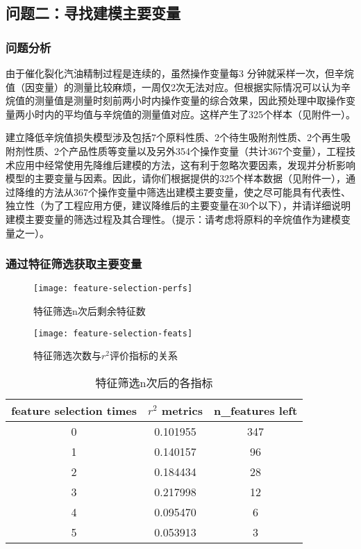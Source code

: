\documentclass[bwprint]{gmcmthesis}
\begin{document}
\FloatBarrier
\subsection{问题二：寻找建模主要变量}
\FloatBarrier
\subsubsection{问题分析}

由于催化裂化汽油精制过程是连续的，虽然操作变量每3 分钟就采样一次，但辛烷值（因变量）的测量比较麻烦，一周仅2次无法对应。但根据实际情况可以认为辛烷值的测量值是测量时刻前两小时内操作变量的综合效果，因此预处理中取操作变量两小时内的平均值与辛烷值的测量值对应。这样产生了325个样本（见附件一）。

建立降低辛烷值损失模型涉及包括7个原料性质、2个待生吸附剂性质、2个再生吸附剂性质、2个产品性质等变量以及另外354个操作变量（共计367个变量），工程技术应用中经常使用先降维后建模的方法，这有利于忽略次要因素，发现并分析影响模型的主要变量与因素。因此，请你们根据提供的325个样本数据（见附件一），通过降维的方法从367个操作变量中筛选出建模主要变量，使之尽可能具有代表性、独立性（为了工程应用方便，建议降维后的主要变量在30个以下），并请详细说明建模主要变量的筛选过程及其合理性。（提示：请考虑将原料的辛烷值作为建模变量之一）。


\FloatBarrier
\subsubsection{通过特征筛选获取主要变量}

\begin{figure}[htb]
	\centering
	\texttt{[image: feature-selection-perfs]}
	\caption{特征筛选n次后剩余特征数}
\end{figure}

\begin{figure}[htb]
	\centering
	\texttt{[image: feature-selection-feats]}
	\caption{特征筛选次数与$r^2$评价指标的关系}
\end{figure}

\begin{table}[!htbp]
	\caption{特征筛选n次后的各指标}\label{tab:001} \centering
	\begin{tabular}{ccc}
		\toprule[1.5pt]
	feature selection times &  $r^2$ metrics &  n\_features left \\
		\midrule[1pt]
           0 &       0.101955 &              347 \\
			1 &       0.140157 &               96 \\
			2 &       0.184434 &               28 \\
			3 &       0.217998 &               12 \\
			4 &       0.095470 &                6 \\
			5 &       0.053913 &                3 \\
		\bottomrule[1.5pt]
	\end{tabular}
\end{table}
\end{document}
